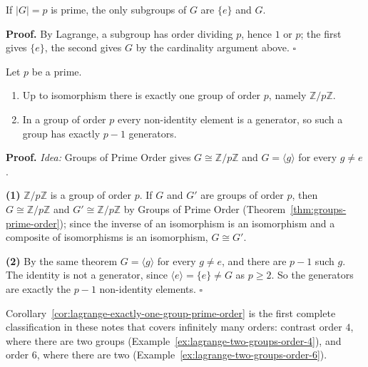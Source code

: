 \documentclass[11pt]{report}
\renewenvironment{proof}[1][Proof]{\noindent\textbf{#1.} }{\hfill$\square$\par\vspace{5pt}}
\begin{document}
\begin{corbox}\label{cor:groups-prime-order-have-no-proper-nontrivial}
If $|G| = p$ is prime, the only subgroups of $G$ are $\{e\}$ and $G$.
\end{corbox}

\begin{proof}
By Lagrange, a subgroup has order dividing $p$, hence $1$ or $p$; the first gives $\{e\}$, the second gives $G$ by the cardinality argument above.
\end{proof}

\begin{corbox}\label{cor:lagrange-exactly-one-group-prime-order}
Let $p$ be a prime.
\begin{enumerate}
    \item Up to isomorphism there is exactly one group of order $p$, namely $\mathbb{Z}/p\mathbb{Z}$.
    \item In a group of order $p$ every non-identity element is a generator, so such a group has exactly $p - 1$ generators.
\end{enumerate}
\end{corbox}

\begin{proof}
\textit{Idea:} Groups of Prime Order gives $G \cong \mathbb{Z}/p\mathbb{Z}$ and $G = \langle g \rangle$ for every $g \neq e$.\par
\textbf{(1)} $\mathbb{Z}/p\mathbb{Z}$ is a group of order $p$. If $G$ and $G'$ are groups of order $p$, then $G \cong \mathbb{Z}/p\mathbb{Z}$ and $G' \cong \mathbb{Z}/p\mathbb{Z}$ by Groups of Prime Order (Theorem~\ref{thm:groups-prime-order}); since the inverse of an isomorphism is an isomorphism and a composite of isomorphisms is an isomorphism, $G \cong G'$.

\textbf{(2)} By the same theorem $G = \langle g \rangle$ for every $g \neq e$, and there are $p - 1$ such $g$. The identity is not a generator, since $\langle e \rangle = \{e\} \neq G$ as $p \geq 2$. So the generators are exactly the $p - 1$ non-identity elements.
\end{proof}

\begin{rembox}\label{rem:classification-once}
Corollary~\ref{cor:lagrange-exactly-one-group-prime-order} is the first complete classification in these notes that covers infinitely many orders: contrast order $4$, where there are two groups (Example~\ref{ex:lagrange-two-groups-order-4}), and order $6$, where there are two (Example~\ref{ex:lagrange-two-groups-order-6}).
\end{rembox}
\end{document}
